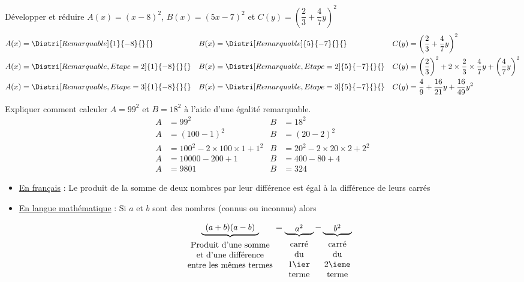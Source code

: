 \begin{exemples*1}
    Développer et réduire $A(x)=(x-8)^2$, $B(x)=(5x-7)^2$ et $C(y)=\left(\dfrac{2}{3}+\dfrac{4}{7}y\right)^2$
    \correction
    \begin{align*}
        A(x)&=\Distri[Remarquable]{1}{-8}{}{}        &B(x)&=\Distri[Remarquable]{5}{-7}{}{}         &C(y)&=\left(\dfrac{2}{3}+\dfrac{4}{7}y\right)^2\\
        A(x)&=\Distri[Remarquable,Etape=2]{1}{-8}{}{}&B(x)&=\Distri[Remarquable,Etape=2]{5}{-7}{}{} &C(y)&=\left(\dfrac{2}{3}\right)^2+2\times\dfrac{2}{3}\times\dfrac{4}{7}y + \left(\dfrac{4}{7}y\right)^2\\
        A(x)&=\Distri[Remarquable,Etape=3]{1}{-8}{}{}&B(x)&=\Distri[Remarquable,Etape=3]{5}{-7}{}{} &C(y)&=\dfrac{4}{9}+\dfrac{16}{21}y+ \dfrac{16}{49}y^2
    \end{align*}
\end{exemples*1}

\begin{exemples*1}
    Expliquer comment calculer $A=99^2$ et $B=18^2$ à l'aide d'une égalité remarquable.
    \correction
    \begin{align*}
        A&=99^2                            &B&=18^2\\
        A&=(100-1)^2                       &B&=(20-2)^2\\
        A&=100^2-2\times 100\times 1 + 1^2 &B&=20^2 - 2\times 20\times 2 + 2^2\\
        A&=\num{10000}-200 + 1             &B&=400 - 80 + 4\\
        A&=\num{9801}                      &B&=324
    \end{align*}
\end{exemples*1}

\begin{propriete}
    \begin{itemize}
    \item \underline{En français} : 
    \og{}Le produit de la somme de deux nombres par leur différence est égal à la différence de leurs carrés\fg{}

    \bigskip
    \item \underline{En \og{}langue\fg{} mathématique} :
    Si $a$ et $b$ sont des nombres (connus ou inconnus) alors 
    
    $$\underbrace{\parbox{0.2\linewidth}{\centering $(a+b)(a-b)$}}_{\parbox{0.3\linewidth}{\centering\vspace*{1mm}Produit d'une somme \\ et d'une différence \\ entre les mêmes termes}}
    =\underbrace{\parbox{0.1\linewidth}{\centering $a^2$}}_{\parbox{0.1\linewidth}{\centering\vspace*{1mm}carré du\\1\ier terme}}
    -\underbrace{\parbox{0.1\linewidth}{\centering $b^2$}}_{\parbox{0.1\linewidth}{\centering\vspace*{1mm}carré du\\2\ieme terme}}
    $$    
    \end{itemize}
\end{propriete}

